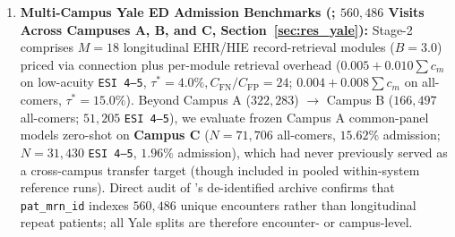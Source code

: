 \documentclass[11pt]{article}
\begin{document}
\begin{enumerate}
  \item \textbf{Multi-Campus Yale ED Admission Benchmarks (\citealp{hong2018predicting}; $560{,}486$ Visits Across Campuses A, B, and C, Section~\ref{sec:res_yale}):} Stage-2 comprises $M=18$ longitudinal EHR/HIE record-retrieval modules ($B=3.0$) priced via connection plus per-module retrieval overhead ($0.005 + 0.010\sum c_m$ on low-acuity \texttt{ESI 4--5}, $\tau^*=4.0\%, C_{\text{FN}}/C_{\text{FP}}=24$; $0.004 + 0.008\sum c_m$ on all-comers, $\tau^*=15.0\%$). Beyond Campus A ($322{,}283$) $\to$ Campus B ($166{,}497$ all-comers; $51{,}205$ \texttt{ESI 4--5}), we evaluate frozen Campus A common-panel models zero-shot on \textbf{Campus C} ($N=71{,}706$ all-comers, $15.62\%$ admission; $N=31{,}430$ \texttt{ESI 4--5}, $1.96\%$ admission), which had never previously served as a cross-campus transfer target (though included in pooled within-system reference runs). Direct audit of \citet{hong2018predicting}'s de-identified archive confirms that \texttt{pat\_mrn\_id} indexes $560{,}486$ unique encounters rather than longitudinal repeat patients; all Yale splits are therefore encounter- or campus-level.
\end{enumerate}
\end{document}

